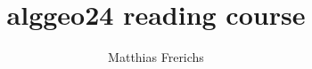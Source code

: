 \documentclass[
oneside
]{scrbook}
\makeatletter
\newcommand{\DOCNAME}{alggeo24 reading course}
\renewcommand\maketitle
  {\noindent
   {\huge\bfseries\@title}%
   \medskip\par\noindent
   {\large\bfseries\@author}%
   \hfill
   {\large\@date}%
   \bigskip\par\noindent
  }
\makeatother
\begin{document}
\title{\DOCNAME}
\author{Matthias Frerichs}
\maketitle

\tableofcontents





\printbibliography
\end{document}
